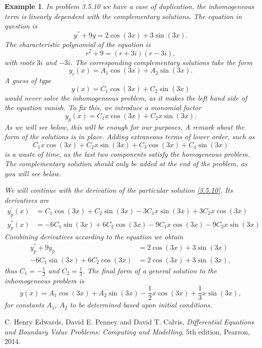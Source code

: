 \documentclass[11pt]{amsart}
\newtheorem{example}{Example}
\numberwithin{equation}{section}
\begin{document}
\begin{example}
In problem 3.5.10 we have a case of duplication, the inhomogeneous term is linearly dependent with the complementary solutions. The equation in question is 
\begin{equation*}
y^{''}+9y=2\cos(3x)+3\sin(3x).
\end{equation*}
The characteristic polynomial of the equation is 
\begin{equation*}
r^2+9=(r+3i)(r-3i),
\end{equation*}
with roots $3i$ and $-3i$. The corresponding complementary solutions take the form
\begin{equation*}
y_c(x)=A_1\cos(3x)+A_2\sin(3x).
\end{equation*}
A guess of type 
\begin{equation*}
y(x)=C_1\cos(3x)+C_2\sin(3x)
\end{equation*}
would never solve the inhomogeneous problem, as it makes the left hand side of the equation vanish. To fix this, we introduce a monomial factor
\begin{equation}\label{3.5.10}
y_p(x)=C_1x\cos(3x)+C_2x\sin(3x).
\end{equation}
As we will see below, this will be enough for our purposes. A remark about the form of the solutions is in place. Adding extraneous terms of lower order, such as 
\begin{equation*}
C_1x\cos(3x)+C_2x\sin(3x)+C_3\cos(3x)+C_4\sin(3x)
\end{equation*}
is a waste of time, as the last two components satisfy the homogeneous problem. The complementary solution should only be added at the end of the problem, as you will see below. 

We will continue with the derivation of the particular solution \eqref{3.5.10}. Its derivatives are 
\begin{align*}
y_{p}^{'}(x) & = C_1\cos(3x)+C_2\sin(3x)-3C_1x\sin(3x)+3C_2x\cos(3x) \\
y_{p}^{''}(x)& = -6C_1\sin(3x) + 6C_2\cos(3x) -9C_1x\cos(3x)-9C_2x\sin(3x)
\end{align*}
Combining derivatives according to the equation we obtain
\begin{align*}
y_{p}^{''}+9y_p & = 2\cos(3x)+3\sin(3x) \\
 -6C_1\sin(3x)+6C_2\cos(3x) & = 2\cos(3x)+3\sin(3x),
\end{align*}
thus $C_1=-\frac{1}{2}$ and $C_2=\frac{1}{3}$. The final form of a general solution to the inhomogeneous problem is 
\begin{equation*}
y(x)=A_1\cos(3x)+A_2\sin(3x)-\frac{1}{2}x\cos(3x)+\frac{1}{3}x\sin(3x), 
\end{equation*}
for constants $A_1$, $A_2$ to be determined based upon initial conditions.
\end{example}
\begin{thebibliography}{0}

 C. Henry Edwards, David E. Penney and David T. Calvis, {\it Differential Equations and Boundary Value Problems: Computing and Modelling}, 5th edition, Pearson, 2014.

\end{thebibliography}
\end{document}
